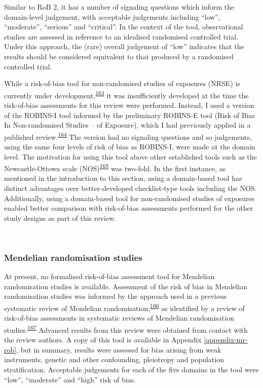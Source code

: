 \documentclass[a4paper, twoside]{templates/ociamthesis}
\begin{document}
Similar to RoB 2, it has a number of signaling questions which inform the domain-level judgement, with acceptable judgements including ``low'', ``moderate'', ``serious'' and ``critical''. In the context of the tool, observational studies are assessed in reference to an idealised randomised controlled trial. Under this approach, the (rare) overall judgement of ``low'' indicates that the results should be considered equivalent to that produced by a randomised controlled trial.

While a risk-of-bias tool for non-randomised studies of exposures (NRSE) is currently under development,\textsuperscript{\protect\hyperlink{ref-morganr2020}{163}} it was insufficiently developed at the time the risk-of-bias assessments for this review were performed. Instead, I used a version of the ROBINS-I tool informed by the preliminary ROBINS-E tool (Risk of Bias In Non-randomised Studies -- of Exposure), which I had previously applied in a published review.\textsuperscript{\protect\hyperlink{ref-french2019}{164}} The version had no signaling questions and so judgements, using the same four levels of risk of bias as ROBINS-I, were made at the domain level. The motivation for using this tool above other established tools such as the Newcastle-Ottowa scale (NOS)\textsuperscript{\protect\hyperlink{ref-wells2000}{165}} was two-fold. In the first instance, as mentioned in the introduction to this section, using a domain-based tool has distinct advantages over better-developed checklist-type tools including the NOS. Additionally, using a domain-based tool for non-randomised studies of exposures enabled better comparison with risk-of-bias assessments performed for the other study designs as part of this review.

~

\hypertarget{mendelian-randomisation-studies}{%
\subsubsection{Mendelian randomisation studies}\label{mendelian-randomisation-studies}}

At present, no formalised risk-of-bias assessment tool for Mendelian randomisation studies is available. Assessment of the risk of bias in Mendelian randomisation studies was informed by the approach used in a previous systematic review of Mendelian randomisation,\textsuperscript{\protect\hyperlink{ref-mamluk2020}{166}} as identified by a review of risk-of-bias assessments in systematic reviews of Mendelian randomisation studies.\textsuperscript{\protect\hyperlink{ref-spiga2021}{167}} Advanced results from this review were obtained from contact with the review authors. A copy of this tool is available in Appendix \ref{appendix-mr-rob}, but in summary, results were assessed for bias arising from weak instruments, genetic and other confounding, pleiotropy and population stratification. Acceptable judgements for each of the five domains in the tool were ``low'', ``moderate'' and ``high'' risk of bias.
\end{document}
